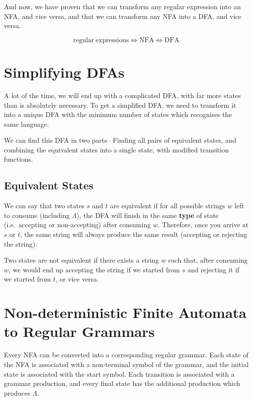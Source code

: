 And now, we have proven that we can transform any regular expression into an NFA, and vice versa, and that we can
 transform any NFA into a DFA, and vice versa.

\begin{equation*}
  \mathrm{regular\ expressions} \Leftrightarrow \mathrm{NFA} \Leftrightarrow \mathrm{DFA}
\end{equation*}

\section*{Simplifying DFAs}

A lot of the time, we will end up with a complicated DFA, with far more states than is absolutely necessary. To get a
 simplified DFA, we need to transform it into a unique DFA with the minimum number of states which recognises the same
 language.

We can find this DFA in two parts-- Finding all pairs of equivalent states, and combining the equivalent states into a
 single state, with modified transition functions.

\subsection*{Equivalent States}

We can say that two states $s$ and $t$ are equivalent if for all possible strings $w$ left to consume (including $\Lambda$),
 the DFA will finish in the same \textbf{type} of state (i.e.\ accepting or non-accepting) after consuming $w$. Therefore,
 once you arrive at $s$ or $t$, the same string will always produce the same result (accepting or rejecting the string).

Two states are not equivalent if there exists a string $w$ such that, after consuming $w$, we would end up accepting the
 string if we started from $s$ and rejecting it if we started from $t$, or vice versa.




\section*{Non-deterministic Finite Automata to Regular Grammars}

Every NFA can be converted into a corresponding regular grammar. Each state of the NFA is associated with a non-terminal
 symbol of the grammar, and the initial state is associated with the start symbol. Each transition is associated with
 a grammar production, and every final state has the additional production which produces $\Lambda$.

